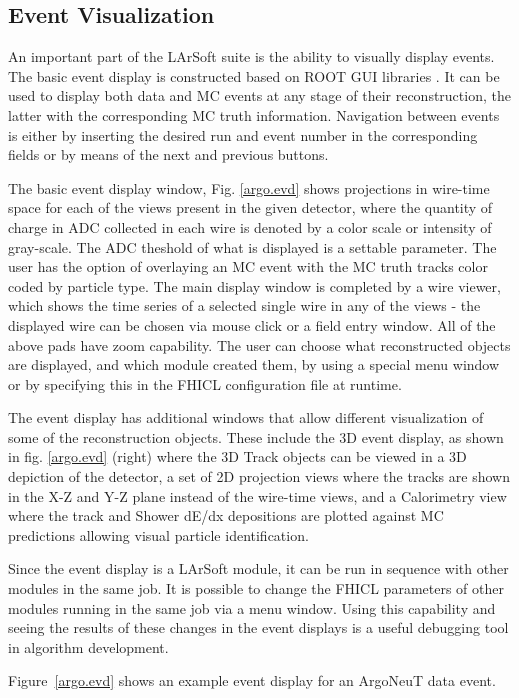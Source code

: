 \documentclass[12pt]{elsarticle}
\begin{document}
\subsection{Event Visualization}
An important part of the LArSoft suite is the ability to visually display events. The basic event display is constructed based on ROOT GUI libraries \cite{ROOT}.
It can be used to display both data and MC events at any stage of their reconstruction, the latter with the corresponding MC truth information. 
Navigation between events is either by inserting the desired run and event number in the corresponding fields or by means of the next and previous buttons.

The basic event display window, Fig. \ref{argo.evd} shows projections in wire-time space for each of the views present in the given detector, where the quantity of charge in ADC collected in each wire is denoted by a color scale or intensity of gray-scale. The ADC theshold of what is displayed is a settable parameter. 
The user has the option of overlaying an MC event with the MC truth tracks color coded by particle type. The main display window is completed by a wire viewer, which shows the time series of a selected single wire in any of the views - the displayed wire can be chosen via mouse click or a field entry window.
All of the above pads have zoom capability. The user can choose what reconstructed objects are displayed, and which module created them, by using a special menu window or by specifying this in the FHICL configuration file at runtime. 

The event display has additional windows that allow different visualization of some of the reconstruction objects. These include the 3D event display, as shown in fig. \ref{argo.evd} (right) where the 3D Track objects can be viewed in a 3D depiction of the detector, a set of 2D projection views where the tracks are shown in the X-Z and Y-Z plane instead of the wire-time views, and a Calorimetry view where the track and Shower dE/dx depositions are plotted against MC predictions allowing visual particle identification. 

Since the event display is a LArSoft module, it can be run in sequence with other modules in the same job. It is possible to change the FHICL parameters of other modules running in the same job via a menu window. Using this capability and seeing the results of these changes in the event displays is a useful debugging tool in algorithm development.

Figure~\ref{argo.evd} shows an example event display for an ArgoNeuT data event.
\end{document}
